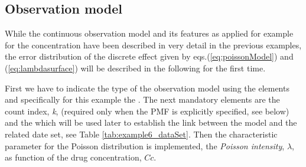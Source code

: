 \subsection{Observation model}
While the continuous observation model and its features as applied for example 
for the concentration have been described in very detail in the previous examples,
the error distribution of the discrete effect given by eqs.(\ref{eq:poissonModel}) 
and (\ref{eq:lambdasurface}) will be described in the following for the first time.

First we have to indicate the type of the observation model using the elements 
 and specifically for this example the . The next 
mandatory elements are the count index, \emph{k}, (required only when the PMF is 
explicitly specified, see below) and the  which will be used later
to establish the link between the model and the related date set, see Table 
\ref{tab:example6_dataSet}.
Then the characteristic parameter for the Poisson distribution is implemented, 
the \emph{Poisson intensity}, $\lambda$, as function of the drug concentration, $Cc$.

